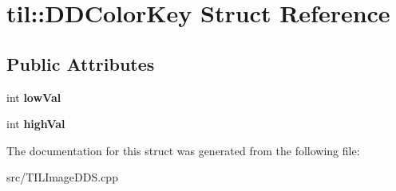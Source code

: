 \hypertarget{structtil_1_1_d_d_color_key}{
\section{til::DDColorKey Struct Reference}
\label{structtil_1_1_d_d_color_key}
}
\subsection*{Public Attributes}
\begin{DoxyCompactItemize}
\item 
\hypertarget{structtil_1_1_d_d_color_key_a9d6c98dd05d808d36f284d9ec1802e12}{
int {\bfseries lowVal}}
\label{structtil_1_1_d_d_color_key_a9d6c98dd05d808d36f284d9ec1802e12}

\item 
\hypertarget{structtil_1_1_d_d_color_key_a86fa8316bcb1097abfb6bc174c42c8f6}{
int {\bfseries highVal}}
\label{structtil_1_1_d_d_color_key_a86fa8316bcb1097abfb6bc174c42c8f6}

\end{DoxyCompactItemize}


The documentation for this struct was generated from the following file:\begin{DoxyCompactItemize}
\item 
src/TILImageDDS.cpp\end{DoxyCompactItemize}

